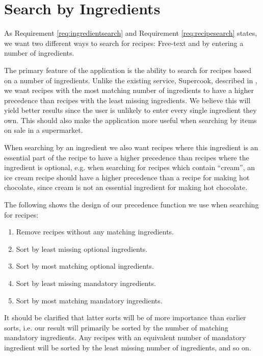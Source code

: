 \section{Search by Ingredients}\label{sec:design_search}
As Requirement \ref{req:ingredientsearch} and Requirement \ref{req:recipesearch} states, we want two different ways to search for recipes: Free-text and by entering a number of ingredients.

The primary feature of the application is the ability to search for recipes based on a number of ingredients. Unlike the existing service, Supercook, described in , we want recipes with the most matching number of ingredients to have a higher precedence than recipes with the least missing ingredients. We believe this will yield better results since the user is unlikely to enter every single ingredient they own. This should also make the application more useful when searching by items on sale in a supermarket.

When searching by an ingredient we also want recipes where this ingredient is an essential part of the recipe to have a higher precedence than recipes where the ingredient is optional, e.g. when searching for recipes which contain ``cream'', an ice cream recipe should have a higher precedence than a recipe for making hot chocolate, since cream is not an essential ingredient for making hot chocolate.

 The following shows the design of our precedence function we use when searching for recipes:
\begin{enumerate}
	\item Remove recipes without any matching ingredients.
	\item Sort by least missing optional ingredients.
	\item Sort by most matching optional ingredients.
	\item Sort by least missing mandatory ingredients.
	\item Sort by most matching mandatory ingredients.
\end{enumerate}
It should be clarified that latter sorts will be of more importance than earlier sorts, i.e. our result will primarily be sorted by the number of matching mandatory ingredients. Any recipes with an equivalent number of mandatory ingredient will be sorted by the least missing number of ingredients, and so on.